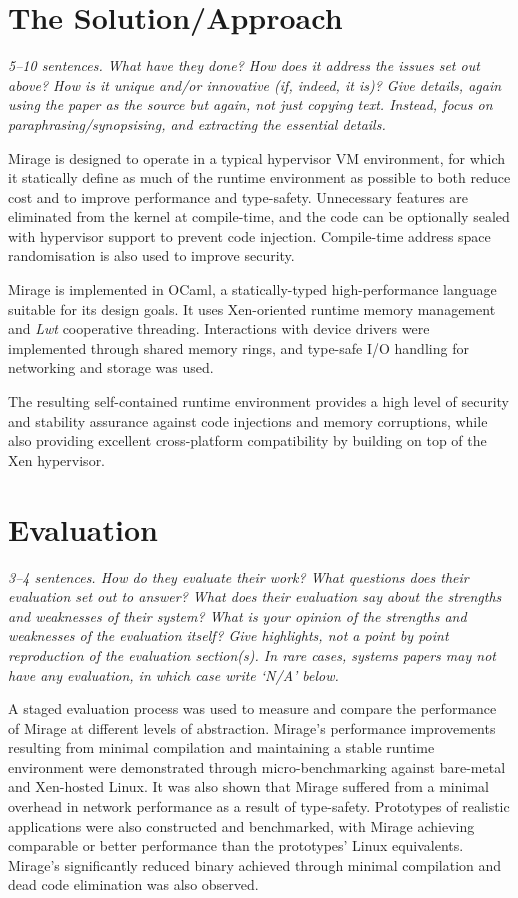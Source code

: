 \documentclass[11pt]{article}
\begin{document}
\section*{The Solution/Approach}
\textsl{5--10 sentences. What have they done? How does it address the issues set out above? How is it unique and/or innovative (if, indeed, it is)? Give details, again using the paper as the source but again, not just copying text. Instead, focus on paraphrasing/synopsising, and extracting the essential details.}

Mirage is designed to operate in a typical hypervisor VM environment, for which it statically define as much of the runtime environment as possible to both reduce cost and to improve performance and type-safety. Unnecessary features are eliminated from the kernel at compile-time, and the code can be optionally sealed with hypervisor support to prevent code injection. Compile-time address space randomisation is also used to improve security.

Mirage is implemented in OCaml, a statically-typed high-performance language suitable for its design goals. It uses Xen-oriented runtime memory management and \emph{Lwt} cooperative threading. Interactions with device drivers were implemented through shared memory rings, and type-safe I/O handling for networking and storage was used.

The resulting self-contained runtime environment provides a high level of security and stability assurance against code injections and memory corruptions, while also providing excellent cross-platform compatibility by building on top of the Xen hypervisor.

\section*{Evaluation}
\textsl{3--4 sentences. How do they evaluate their work? What questions does their evaluation set out to answer? What does their evaluation say about the strengths and weaknesses of their system? What is your opinion of the strengths and weaknesses of the evaluation itself?  Give highlights, not a point by point reproduction of the evaluation section(s). In rare cases, systems papers may not have any evaluation, in which case write `N/A' below.}

A staged evaluation process was used to measure and compare the performance of Mirage at different levels of abstraction. Mirage's performance improvements resulting from minimal compilation and maintaining a stable runtime environment were demonstrated through micro-benchmarking against bare-metal and Xen-hosted Linux. It was also shown that Mirage suffered from a minimal overhead in network performance as a result of type-safety. Prototypes of realistic applications were also constructed and benchmarked, with Mirage achieving comparable or better performance than the prototypes' Linux equivalents. Mirage's significantly reduced binary achieved through minimal compilation and dead code elimination was also observed.
\end{document}
